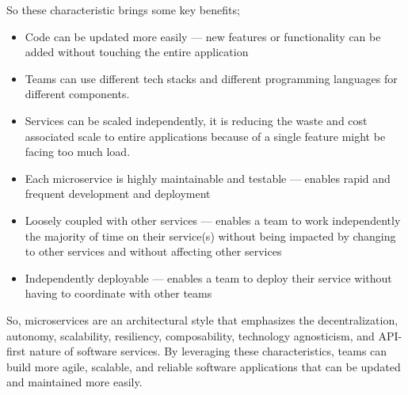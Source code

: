 So these characteristic brings some key benefits;
\begin{itemize}
    \item Code can be updated more easily — new features or functionality can be added without touching the entire application
    \item Teams can use different tech stacks and different programming languages for different components.
    \item Services can be scaled independently, it is reducing the waste and cost associated scale to entire applications because of a single feature might be facing too much load.
    \item Each microservice is highly maintainable and testable — enables rapid and frequent development and deployment
    \item Loosely coupled with other services — enables a team to work independently the majority of time on their service(s) without being impacted by changing to other services and without affecting other services
    \item Independently deployable — enables a team to deploy their service without having to coordinate with other teams
\end{itemize}
So, microservices are an architectural style that emphasizes the decentralization, autonomy, scalability, resiliency, composability, technology agnosticism, and API-first nature of software services. By leveraging these characteristics, teams can build more agile, scalable, and reliable software applications that can be updated and maintained more easily.
